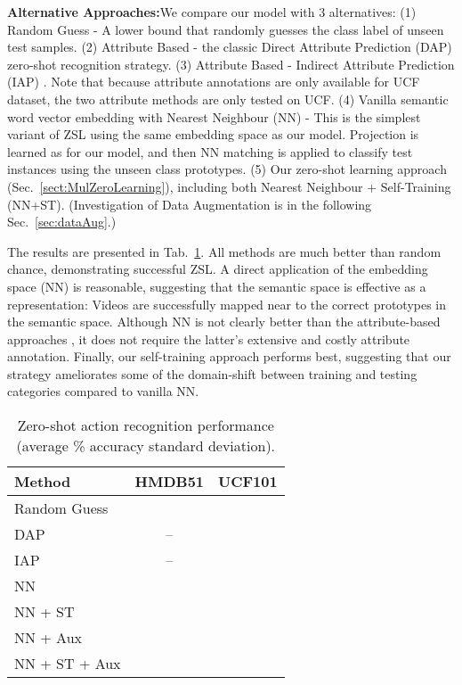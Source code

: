 \documentclass{article}
\begin{document}
\noindent\textbf{Alternative Approaches:}\quad We compare our model with 3 alternatives: (1) Random Guess - A lower bound that randomly guesses the class label of unseen test samples. (2) Attribute Based - the classic Direct Attribute Prediction (DAP) \cite{lampert2013attributeZSL} zero-shot recognition strategy.  (3) Attribute Based - Indirect Attribute Prediction (IAP) \cite{lampert2013attributeZSL}.
Note that because attribute annotations are only available for UCF dataset, the two attribute methods are only tested on UCF. (4) Vanilla semantic word vector embedding with Nearest Neighbour (NN) - This is the simplest variant of ZSL using the same embedding space as our model. Projection  is learned as for our model, and then NN matching is applied to classify test instances using the unseen class prototypes. (5) Our zero-shot learning approach (Sec.~\ref{sect:MulZeroLearning}), including both Nearest Neighbour + Self-Training (NN+ST). (Investigation of Data Augmentation is in the following Sec.~\ref{sec:dataAug}.) 

The results are presented in Tab.~\ref{tab:ZeroshotAcc}. All methods are much better than random chance, demonstrating successful ZSL. A direct application of the embedding space (NN) is reasonable, suggesting that the semantic space is effective as a representation: Videos are successfully mapped near to the correct prototypes in the semantic space. Although NN is not clearly better than the  attribute-based approaches \cite{lampert2013attributeZSL}, it does not require the latter's extensive and costly attribute annotation. Finally, our self-training approach  performs best, suggesting that our strategy ameliorates some of the domain-shift between training and testing categories compared to vanilla NN.

\begin{table}[h]
  \centering
  \caption{Zero-shot action recognition performance (average \% accuracy  standard deviation).}
\begin{tabular}{lrr}
    \toprule
    Method & \multicolumn{1}{c}{HMDB51} & \multicolumn{1}{c}{UCF101} \\
    \midrule
    \multicolumn{1}{l}{Random Guess} & \multicolumn{1}{c}{} & \multicolumn{1}{c}{} \\
    \multicolumn{1}{l}{DAP\cite{lampert2013attributeZSL}} & \multicolumn{1}{c}{--} & \multicolumn{1}{c}{} \\
    \multicolumn{1}{l}{IAP\cite{lampert2013attributeZSL}} & \multicolumn{1}{c}{--} & \multicolumn{1}{c}{} \\
    \multicolumn{1}{l}{NN} & \multicolumn{1}{c}{} &  \multicolumn{1}{c}{}\\
    \multicolumn{1}{l}{NN + ST} & \multicolumn{1}{c}{\textbf{}} &  \multicolumn{1}{c}{\textbf{}}\\
    \multicolumn{1}{l}{NN + Aux} & \multicolumn{1}{c}{} &  \multicolumn{1}{c}{\textbf{}}\\
    \multicolumn{1}{l}{NN + ST + Aux} & \multicolumn{1}{c}{} &  \multicolumn{1}{c}{\textbf{}}\\
    \bottomrule
    \end{tabular}\label{tab:ZeroshotAcc}\vspace{-0.4cm}
\end{table}
\end{document}

